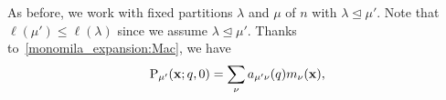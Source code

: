 \documentclass[12pt,a4paper,reqno]{amsart}
\theoremstyle{plain}
\theoremstyle{definition}
\newcommand{\less}{\unlhd}
\newcommand{\1}{\mathds{1}}
\renewcommand{\P}{\mathrm{P}}
\newcommand{\x}{{\bf x}}
\begin{document}
As before, we work with fixed partitions $\lambda $ and $\mu$ of $n$ with $\lambda\less \mu'$. 
Note that $\ell(\mu') \leq \ell(\lambda)$ since we assume $\lambda \less \mu'$. Thanks to~\cref{monomila_expansion:Mac}, we have 
\begin{equation}\label{monomila_expansion_1:Mac}
    \P_{\mu'}(\x;q,0)=\sum_{\nu}a_{\mu'\nu}(q)m_\nu(\x),
\end{equation}
\end{document}
